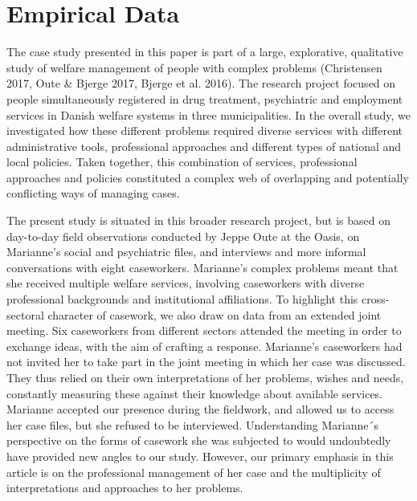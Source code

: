 \chapter{Empirical Data}
The case study presented in this paper is part of a large, explorative, qualitative study of welfare management of people with complex problems (Christensen 2017, Oute \& Bjerge 2017, Bjerge et al. 2016). The research project focused on people simultaneously registered in drug treatment, psychiatric and employment services in Danish welfare systems in three municipalities. In the overall study, we investigated how these different problems required diverse services with different administrative tools, professional approaches and different types of national and local policies. Taken together, this combination of services, professional approaches and policies constituted a complex web of overlapping and potentially conflicting ways of managing cases.
\par
The present study is situated in this broader research project, but is based on day-to-day field observations conducted by Jeppe Oute at the Oasis, on Marianne’s social and psychiatric files, and interviews and more informal conversations with eight caseworkers. Marianne’s complex problems meant that she received multiple welfare services, involving caseworkers with diverse professional backgrounds and institutional affiliations. To highlight this cross-sectoral character of casework, we also draw on data from an extended joint meeting. Six caseworkers from different sectors attended the meeting in order to exchange ideas, with the aim of crafting a response. Marianne’s caseworkers had not invited her to take part in the joint meeting in which her case was discussed. They thus relied on their own interpretations of her problems, wishes and needs, constantly measuring these against their knowledge about available services. Marianne accepted our presence during the fieldwork, and allowed us to access her case files, but she refused to be interviewed. Understanding Marianne´s perspective on the forms of casework she was subjected to would undoubtedly have provided new angles to our study. However, our primary emphasis in this article is on the professional management of her case and the multiplicity of interpretations and approaches to her problems.
\par
